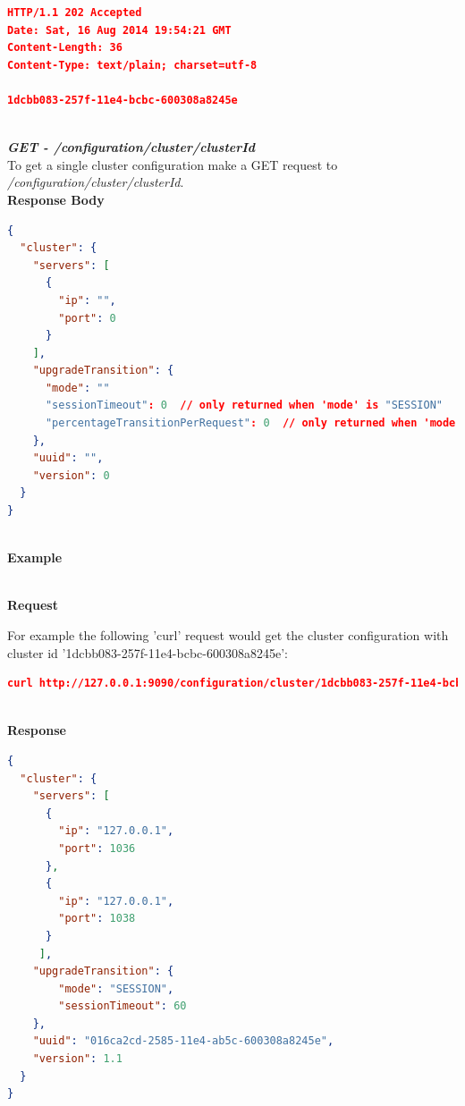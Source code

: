 \documentclass[a4paper,11pt,twoside]{article}
\begin{document}
\begin{lstlisting}[language=json,firstnumber=1]
HTTP/1.1 202 Accepted
Date: Sat, 16 Aug 2014 19:54:21 GMT
Content-Length: 36
Content-Type: text/plain; charset=utf-8
 
1dcbb083-257f-11e4-bcbc-600308a8245e
\end{lstlisting}

\noindent \\
\textit{\textbf{GET - /configuration/cluster/{clusterId}}}\\

\noindent 
To get a single cluster configuration make a GET request to \textit{/configuration/cluster/{clusterId}}.\\ 

\noindent 
\textbf{Response Body}\\

\begin{lstlisting}[language=json,firstnumber=1]
{
  "cluster": {
    "servers": [
      {
        "ip": "",
        "port": 0
      }
    ],
    "upgradeTransition": {
      "mode": ""
      "sessionTimeout": 0  // only returned when 'mode' is "SESSION" 
      "percentageTransitionPerRequest": 0  // only returned when 'mode' is "GRADUAL"
    },
    "uuid": "",
    "version": 0
  }
} 
\end{lstlisting}

\noindent \\
\textbf{Example}

\noindent \\
\textbf{Request}

\noindent 
For example the following 'curl' request would get the cluster configuration with cluster id '1dcbb083-257f-11e4-bcbc-600308a8245e':\\

\begin{lstlisting}[language=json,firstnumber=1]
curl http://127.0.0.1:9090/configuration/cluster/1dcbb083-257f-11e4-bcbc-600308a8245e -X GET
\end{lstlisting}

\noindent \\
\textbf{Response}\\

\begin{lstlisting}[language=json,firstnumber=1]
{
  "cluster": {
    "servers": [
      {
        "ip": "127.0.0.1",
        "port": 1036
      },
      {
        "ip": "127.0.0.1",
        "port": 1038
      }
     ],
    "upgradeTransition": {
        "mode": "SESSION",
        "sessionTimeout": 60
    },
    "uuid": "016ca2cd-2585-11e4-ab5c-600308a8245e",
    "version": 1.1
  }
}
  
\end{lstlisting}
\end{document}
